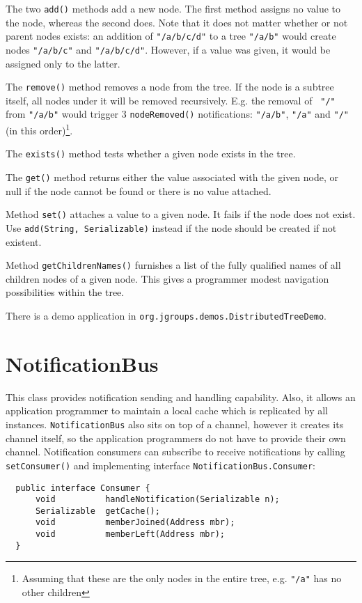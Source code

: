   The two {\tt add()} methods add a new node. The first method assigns no value to
  the node, whereas the second does. Note that it does not matter whether or not
  parent nodes exists: an addition of {\tt "/a/b/c/d"} to a tree {\tt "/a/b"} would
  create nodes {\tt "/a/b/c"} and {\tt "/a/b/c/d"}. However, if a value was given, it
  would be assigned only to the latter.

  The {\tt remove()} method removes a node from the tree. If the node is a subtree
  itself, all nodes under it will be removed recursively. E.g. the removal of {\tt
  "/"} from {\tt "/a/b"} would trigger 3 {\tt nodeRemoved()} notifications: {\tt "/a/b"},
  {\tt "/a"} and {\tt "/"} (in this order)\footnote{Assuming that these are the only
  nodes in the entire tree, e.g. {\tt "/a"} has no other children}.

  The {\tt exists()} method tests whether a given node exists in the tree.

  The {\tt get()} method returns either the value associated with the given node, or
  null if the node cannot be found or there is no value attached.

  Method {\tt set()} attaches a value to a given node. It fails if the node does not
  exist. Use {\tt add(String, Serializable)} instead if the node should be created if
  not existent.

  Method {\tt getChildrenNames()} furnishes a list of the fully qualified names of
  all children nodes of a given node. This gives a programmer modest navigation
  possibilities within the tree.

  There is a demo application in {\tt org.jgroups.demos.DistributedTreeDemo}.



  \section{NotificationBus}

  This class provides notification sending and handling capability. Also, it allows
  an application programmer to maintain a local cache which is replicated by all
  instances. {\tt NotificationBus} also sits on top of a channel, however it creates
  its channel itself, so the application programmers do not have to provide their own
  channel. Notification consumers can subscribe to receive notifications by calling
  {\tt setConsumer()} and implementing interface {\tt NotificationBus.Consumer}:

  \begin{small}
  \begin{verbatim}
  public interface Consumer {
      void          handleNotification(Serializable n);
      Serializable  getCache();
      void          memberJoined(Address mbr);
      void          memberLeft(Address mbr);
  }
  \end{verbatim}
  \end{small}

